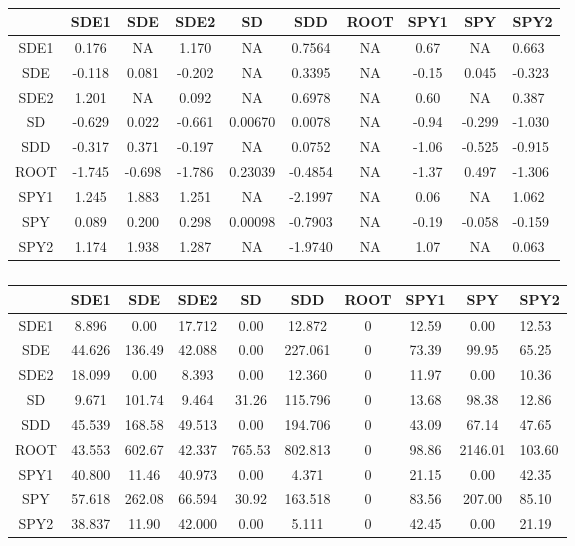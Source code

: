 \documentclass[english]{article}
\providecommand{\tabularnewline}{\\}
\begin{document}
\begin{table}
\caption{\label{tab:heatmap}}
\noindent \centering{}\begin{tabular}{ccccccccc}
\hline
& SDE1 & SDE & SDE2 & SD & SDD & ROOT & SPY1 & SPY & SPY2\tabularnewline
\hline
SDE1& 0.176  &   NA  &1.170  &    NA & 0.7564  & NA & 0.67 &    NA & 0.663\tabularnewline
SDE & -0.118 & 0.081 &-0.202 &     NA&  0.3395 &  NA& -0.15&  0.045& -0.323\tabularnewline
SDE2& 1.201  &   NA  &0.092  &    NA & 0.6978  & NA & 0.60 &    NA & 0.387\tabularnewline
SD  & -0.629 & 0.022 &-0.661 &0.00670&  0.0078 &  NA& -0.94& -0.299& -1.030\tabularnewline
SDD & -0.317 & 0.371 &-0.197 &     NA&  0.0752 &  NA& -1.06& -0.525& -0.915\tabularnewline
ROOT& -1.745 &-0.698 &-1.786 &0.23039& -0.4854 &  NA& -1.37&  0.497& -1.306\tabularnewline
SPY1& 1.245  &1.883  &1.251  &    NA &-2.1997  & NA & 0.06 &    NA & 1.062\tabularnewline
SPY & 0.089  &0.200  &0.298 &0.00098 &-0.7903  & NA &-0.19 &-0.058 &-0.159\tabularnewline
SPY2& 1.174  &1.938  &1.287  &    NA &-1.9740  & NA & 1.07 &    NA & 0.063\tabularnewline
\hline
\end{tabular}
\end{table}
\clearpage{}

\begin{table}
\caption{\label{tab:obsheatmap}}
\noindent \centering{}\begin{tabular}{ccccccccc}
\hline
& SDE1 & SDE & SDE2 & SD & SDD & ROOT & SPY1 & SPY & SPY2\tabularnewline
\hline
SDE1&8.896 &  0.00 &17.712  & 0.00 & 12.872   & 0 &12.59  &  0.00  &12.53\tabularnewline
SDE &44.626& 136.49& 42.088 &  0.00& 227.061  &  0& 73.39 &  99.95 & 65.25\tabularnewline
SDE2&18.099&   0.00&  8.393 &  0.00&  12.360  &  0& 11.97 &   0.00 & 10.36\tabularnewline
SD  &9.671 &101.74 & 9.464  &31.26 &115.796   & 0 &13.68  & 98.38  &12.86\tabularnewline
SDD &45.539& 168.58& 49.513 &  0.00& 194.706  &  0& 43.09 &  67.14 & 47.65\tabularnewline
ROOT&43.553& 602.67& 42.337 &765.53& 802.813  &  0& 98.86 &2146.01 &103.60\tabularnewline
SPY1&40.800&  11.46& 40.973 &  0.00&   4.371  &  0& 21.15 &   0.00 & 42.35\tabularnewline
SPY &57.618& 262.08& 66.594 & 30.92& 163.518  &  0& 83.56 & 207.00 & 85.10\tabularnewline
SPY2&38.837&  11.90& 42.000 &  0.00&   5.111  &  0& 42.45 &   0.00 & 21.19\tabularnewline
\hline
\end{tabular}
\end{table}
\clearpage{}
\end{document}

